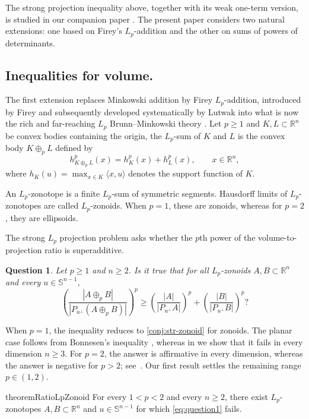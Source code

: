 \documentclass[11pt,a4paper]{amsart}
\theoremstyle{plain}
\newtheorem{ques}[conj]{Question}
\theoremstyle{definition}
\newcommand{\MainTheoremExtra}{.}
\newcommand{\R}{\mathbb R}
\newcommand{\s}{\mathbb S}
\begin{document}
The strong projection inequality above, together with its weak
one-term version, is studied in our companion paper
\cite{FHMNWZ-26-I}. The present paper considers two natural extensions:
one based on Firey's \(L_p\)-addition and the other on sums of powers
of determinants.
\subsection{Inequalities for volume.}
The first extension replaces Minkowski addition by Firey
\(L_p\)-addition, introduced by Firey \cite{F-62} and subsequently
developed systematically by Lutwak into what is now the rich and
far-reaching \(L_p\) Brunn--Minkowski theory
\cite{L-93,L-96}. Let
$p\geq1$ 
and $K,L\subset\R^n$ be convex bodies containing the origin, the
$L_p$-sum of $K$ and $L$ is the convex body $K\oplus_p L$ defined by
\[
 h_{K\oplus_p L}^p(x)=h_K^p(x)+h_L^p(x),
 \qquad x\in\R^n,
\]
where $h_K(u)=\max_{x\in K}\langle x, u \rangle$ denotes the support function of $K$. %

An $L_p$-zonotope is a finite $L_p$-sum of symmetric segments. Hausdorff limits of $L_p$-zonotopes are called $L_p$-zonoids.  When $p=1$, these are zonoids, whereas for $p=2$, they are ellipsoids.

The strong $L_p$ projection problem \cite{FMMZ-24} asks whether the $p$th power of the
volume-to-projection ratio is superadditive.

\begin{ques}\label{ques:ratio-Lp-zonoid}
Let $p\geq1$ and $n \geq 2$. Is it true that for all $L_p$-zonoids $A,B\subset\R^n$ and every
$u\in\s^{n-1}$,
\begin{equation}\label{eq:question1}
 \left(\frac{|A\oplus_p B|}{|P_{u^\perp}(A\oplus_p B)|}\right)^p
 \geq
 \left(\frac{|A|}{|P_{u^\perp}A|}\right)^p
 +\left(\frac{|B|}{|P_{u^\perp}B|}\right)^p?
\end{equation}
\end{ques}

When $p=1$, the inequality reduces to \eqref{conj:str-zonoid}
for zonoids. The planar case follows from Bonnesen's inequality
\cite{B-1929}, whereas in \cite{FHMNWZ-26-I} we show that it fails in
every dimension $n\geq 3$.  For $p=2$, the answer is affirmative in every dimension, whereas the answer is negative
for $p>2$; see~\cite[Theorem~6.2 and Proposition~6.8]{FMMZ-24}.  Our first result settles the remaining range $p\in (1,2)$.

\begin{restatable}{theorem}{RatioLpZonoid}\label{thm:ratio-Lp-zonoid}
For every $1<p<2$ and every $n\geq2$, there exist $L_p$-zonotopes
$A,B\subset\R^n$ and $u\in\s^{n-1}$ for which
\eqref{eq:question1} fails\MainTheoremExtra
\end{restatable}
\end{document}
